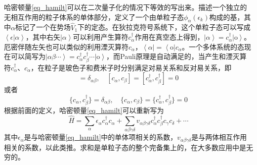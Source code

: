 哈密顿量\ref{eq_hamilt}可以在二次量子化的情况下等效的写出来。描述一个独立的无相互作用的粒子体系的单体部分，定义了一个由单粒子态$\phi_\alpha(\epsilon_k)$构成的基，其中$\alpha$标记了一个在势场$\widehat{V}_1$下的定态。在狄拉克符号系统下，这个单粒子态可以写成$\left<\epsilon|\alpha\right>$，其中右矢$\left|\alpha\right>$可以利用产生算符$c_\alpha^\dag$作用在真空态上得到，$\left|\alpha\right>=c_\alpha^\dag\left|\textrm{o}\right>$。厄密伴随左矢也可以类似的利用湮灭算符$c_\alpha$，$\left<\alpha\right|=\left<\textrm{o}\right|c_\alpha$。一个多体系统的态现在可以简写为$\left|\alpha\beta\cdots\right>=c_\alpha^\dag c_\beta^\dag\cdots\left|\textrm{o}\right>$，而Pauli原理是自动满足的，当产生和湮灭算符$c_\alpha^\dag$、$c_\alpha$，在粒子是玻色子和费米子时分别满足对易关系和反对易关系，即
\begin{equation*}
[c_\alpha,c_\beta^\dag]=\delta_{\alpha\beta},\quad[c_\alpha,c_\beta]=[c_\alpha^\dag,c_\beta^\dag]=0
\end{equation*}
或者
\begin{equation*}
\{c_\alpha,c_\beta^\dag\}=\delta_{\alpha\beta},\quad\{c_\alpha,c_\beta\}=\{c_\alpha^\dag,c_\beta^\dag\}=0
\end{equation*}
根据前面的定义，哈密顿量\ref{eq_hamilt}可以重新写为
\begin{equation}
\widehat{H}=\sum_\alpha\epsilon_\alpha c_\alpha^\dag c_\alpha+\sum_{\alpha\beta\gamma\delta}v_{\alpha\beta\gamma\delta}c_\alpha^\dag c_\beta^\dag c_\gamma c_\delta+\cdots
\end{equation}
其中$\epsilon_\alpha$是与哈密顿量\ref{eq_hamilt}中的单体项相关的系数，$v_{\alpha\beta\gamma\delta}$是与两体相互作用相关的系数，以此类推。求和是单粒子态的整个完备集上的，在大多数应用中是无穷的。